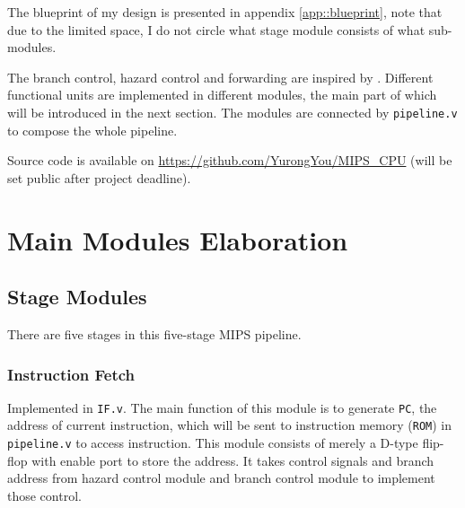 \documentclass[paper=a4, fontsize=11pt]{scrartcl} %
\numberwithin{equation}{section} %
\numberwithin{figure}{section} %
\numberwithin{table}{section} %
\begin{document}
\begin{spacing}{1.5}
	The blueprint of my design is presented in appendix \ref{app::blueprint}, note that due to the limited space, I do not circle what stage module consists of what sub-modules.
	
	The branch control, hazard control and forwarding are inspired by \cite{COD}. Different functional units are implemented in different modules, the main part of which will be introduced in the next section. The modules are connected by \verb|pipeline.v| to compose the whole pipeline.
	
	Source code is available on \url{https://github.com/YurongYou/MIPS_CPU} (will be set public after project deadline).
\newpage
\section{Main Modules Elaboration}
    \subsection{Stage Modules}
    	There are five stages in this five-stage MIPS pipeline.
    	\subsubsection{Instruction Fetch} Implemented in \verb|IF.v|. The main function of this module is to generate \verb|PC|, the address of current instruction, which will be sent to instruction memory (\verb|ROM|) in \verb|pipeline.v| to access instruction. This module consists of merely a D-type flip-flop with enable port to store the address. It takes control signals and branch address from hazard control module and branch control module to implement those control.

\end{spacing}
\end{document}
